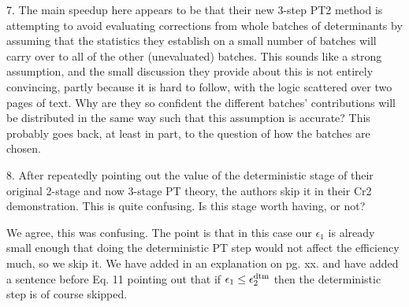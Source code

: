 \documentclass[
preprint,
onecolumn,
 superscriptaddress,
 amsmath,amssymb,
 aps,
]{revtex4-1}
\begin{document}
\vskip 5mm {\color{blue}
7. The main speedup here appears to be that their new 3-step PT2 method is attempting to avoid
evaluating corrections from whole batches of determinants by assuming that the statistics
they establish on a small number of batches will carry over to all of the other (unevaluated)
batches. This sounds like a strong assumption, and the small discussion they provide about
this is not entirely convincing, partly because it is hard to follow, with the logic scattered
over two pages of text. Why are they so confident the different batches' contributions will
be distributed in the same way such that this assumption is accurate? This probably goes back,
at least in part, to the question of how the batches are chosen.
}\color{black}

\vskip 5mm {\color{blue}
8. After repeatedly pointing out the value of the deterministic stage of their original
2-stage and now 3-stage PT theory, the authors skip it in their Cr2 demonstration. This is
quite confusing. Is this stage worth having, or not?
}\color{black}

We agree, this was confusing.  The point is that in this case our $\epsilon_1$ is already
small enough that doing the deterministic PT step would not affect the efficiency much,
so we skip it.  We have added in an explanation on pg. xx. and have added a sentence
before Eq. 11 pointing out that if $\epsilon_1 \le \epsilon_2^{\rm dtm}$ then the deterministic
step is of course skipped.
\end{document}
